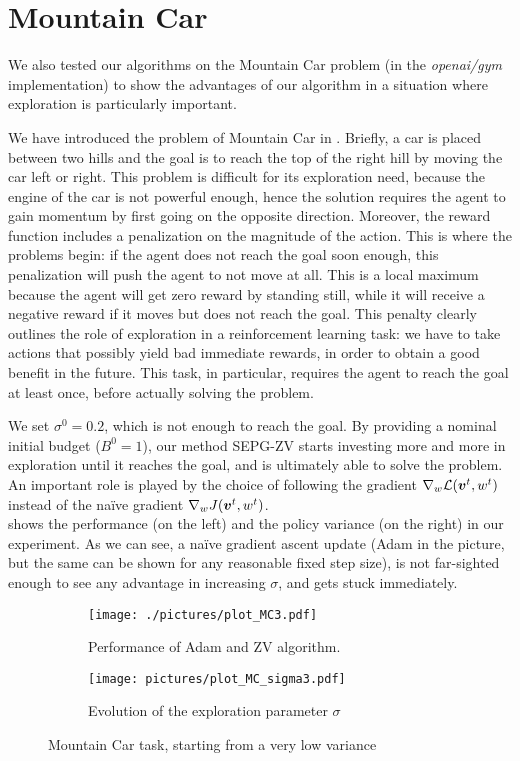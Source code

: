 \section{Mountain Car}\label{sec:mountain}

We also tested our algorithms on the Mountain Car problem (in the \textit{openai/gym} implementation) to show the advantages of our algorithm in a situation where exploration is particularly important. 

We have introduced the problem of Mountain Car in . Briefly, a car is placed between two hills and the goal is to reach the top of the right hill by moving the car left or right. This problem is difficult for its exploration need, because the engine of the car is not powerful enough, hence the solution requires the agent to gain momentum by first going on the opposite direction. Moreover, the reward function includes a penalization on the magnitude of the action. This is where the problems begin: if the agent does not reach the goal soon enough, this penalization will push the agent to not move at all. This is a local maximum because the agent will get zero reward by standing still, while it will receive a negative reward if it moves but does not reach the goal. This penalty clearly outlines the role of exploration in a reinforcement learning task: we have to take actions that possibly yield bad immediate rewards, in order to obtain a good benefit in the future. This task, in particular, requires the agent to reach the goal at least once, before actually solving the problem.


We set $\sigma^0 = 0.2$, which is not enough to reach the goal. By providing a nominal initial budget ($B^0 = 1$), our method SEPG-ZV starts investing more and more in exploration until it reaches the goal, and is ultimately able to solve the problem. An important role is played by the choice of following the gradient $ \nabla_{w}\mathcal{L}(\boldsymbol{v}^t, w^t)$ instead of the na\"ive gradient $\nabla_w J(\boldsymbol{v}^t, w^t)$. \\
 shows the performance (on the left) and the policy variance (on the right) in our experiment. As we can see, a na\"ive gradient ascent update (Adam in the picture, but the same can be shown for any reasonable fixed step size), is not far-sighted enough to see any advantage in increasing $\sigma$, and gets stuck immediately. 


\begin{figure}[t]
\centering
\begin{subfigure}[t]{0.49\textwidth}
\texttt{[image: ./pictures/plot\_MC3.pdf]}
\caption{Performance of Adam and ZV algorithm.}
\end{subfigure}
\begin{subfigure}[t]{0.49\textwidth}
\texttt{[image: pictures/plot\_MC\_sigma3.pdf]}
\caption{Evolution of the exploration parameter $\sigma$}
\end{subfigure}
\caption{Mountain Car task, starting from a very low variance}\label{fig:mc}
\end{figure}





